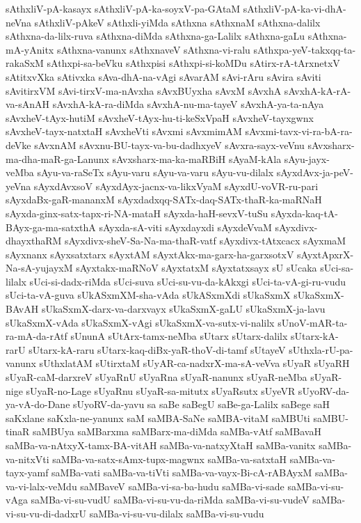 {sAthxliV-pA-kasayx
sAthxliV-pA-ka-soyxV-pa-GAtaM
sAthxliV-pA-ka-vi-dhA-neVna
sAthxliV-pAkeV
sAthxli-yiMda
sAthxna
sAthxnaM
sAthxna-dalilx
sAthxna-da-lilx-ruva
sAthxna-diMda
sAthxna-ga-Lalilx
sAthxna-gaLu
sAthxna-mA-yAnitx
sAthxna-vanunx
sAthxnaveV
sAthxna-vi-ralu
sAthxpa-yeV-takxqq-ta-rakaSxM
sAthxpi-sa-beVku
sAthxpisi
sAthxpi-si-koMDu
sAtirx-rA-tArxnetxV
sAtitxvXka
sAtivxka
sAva-dhA-na-vAgi
sAvarAM
sAvi-rAru
sAvira
sAviti
sAvitirxVM
sAvi-tirxV-ma-nAvxha
sAvxBUyxha
sAvxM
sAvxhA
sAvxhA-kA-rA-va-sAnAH
sAvxhA-kA-ra-diMda
sAvxhA-nu-ma-tayeV
sAvxhA-ya-ta-nAya
sAvxheV-tAyx-hutiM
sAvxheV-tAyx-hu-ti-keSxVpaH
sAvxheV-tayxgwnx
sAvxheV-tayx-natxtaH
sAvxheVti
sAvxmi
sAvxmimAM
sAvxmi-tavx-vi-ra-bA-ra-deVke
sAvxnAM
sAvxnu-BU-tayx-va-bu-dadhxyeV
sAvxra-sayx-veVnu
sAvxsharx-ma-dha-maR-ga-Lanunx
sAvxsharx-ma-ka-maRBiH
sAyaM-kAla
sAyu-jayx-veMba
sAyu-va-raSeTx
sAyu-varu
sAyu-va-varu
sAyu-vu-dilalx
sAyxdAvx-ja-peV-yeVna
sAyxdAvxsoV
sAyxdAyx-jacnx-va-likxVyaM
sAyxdU-voVR-ru-pari
sAyxdaBx-gaR-mananxM
sAyxdadxqq-SATx-daq-SATx-thaR-ka-maRNaH
sAyxda-ginx-satx-tapx-ri-NA-mataH
sAyxda-haH-sevxV-tuSu
sAyxda-kaq-tA-BAyx-ga-ma-satxthA
sAyxda-sA-viti
sAyxdayxdi
sAyxdeVvaM
sAyxdivx-dhayxthaRM
sAyxdivx-sheV-Sa-Na-ma-thaR-vatf
sAyxdivx-tAtxcacx
sAyxmaM
sAyxnanx
sAyxsatxtarx
sAyxtAM
sAyxtAkx-ma-garx-ha-garxsotxV
sAyxtApxrX-Na-sA-yujayxM
sAyxtakx-maRNoV
sAyxtatxM
sAyxtatxsayx
sU
sUcaka
sUci-sa-lilalx
sUci-si-dadx-riMda
sUci-suva
sUci-su-vu-da-kAkxgi
sUci-ta-vA-gi-ru-vudu
sUci-ta-vA-guva
sUkASxmXM-sha-vAda
sUkASxmXdi
sUkaSxmX
sUkaSxmX-BAvAH
sUkaSxmX-darx-va-darxvayx
sUkaSxmX-gaLU
sUkaSxmX-ja-lavu
sUkaSxmX-vAda
sUkaSxmX-vAgi
sUkaSxmX-va-sutx-vi-nalilx
sUnoV-mAR-ta-ra-mA-da-rAtf
sUnunA
sUtArx-tamx-neMba
sUtarx
sUtarx-dalilx
sUtarx-kA-rarU
sUtarx-kA-raru
sUtarx-kaq-diBx-yaR-thoV-di-tamf
sUtayeV
sUthxla-rU-pa-vanunx
sUthxlatAM
sUtirxtaM
sUyAR-ca-nadxrX-ma-sA-veVva
sUyaR
sUyaRH
sUyaR-caM-darxreV
sUyaRnU
sUyaRna
sUyaR-nanunx
sUyaR-neMba
sUyaR-nige
sUyaR-no-Lage
sUyaRnu
sUyaR-sa-mitutx
sUyaRsutx
sUyeVR
sUyoRV-da-ya-vA-do-Dane
sUyoRV-da-yavu
sa
saBe
saBegU
saBe-ga-Lalilx
saBege
saH
saKxlane
saKxla-ne-yanunx
saM
saMBA-SaNe
saMBA-vitaM
saMBUti
saMBU-tinaR
saMBUya
saMBarxma
saMBarx-ma-diMda
saMBa-vAtf
saMBavaH
saMBa-va-nAtxyX-tamx-BA-vitAH
saMBa-va-natxyXtaH
saMBa-vanitx
saMBa-va-nitxVti
saMBa-va-satx-sAmx-tupx-magwnx
saMBa-va-satxtaH
saMBa-va-tayx-yamf
saMBa-vati
saMBa-va-tiVti
saMBa-va-vayx-Bi-cA-rABAyxM
saMBa-va-vi-lalx-veMdu
saMBaveV
saMBa-vi-sa-ba-hudu
saMBa-vi-sade
saMBa-vi-su-vAga
saMBa-vi-su-vudU
saMBa-vi-su-vu-da-riMda
saMBa-vi-su-vudeV
saMBa-vi-su-vu-di-dadxrU
saMBa-vi-su-vu-dilalx
saMBa-vi-su-vudu
}
